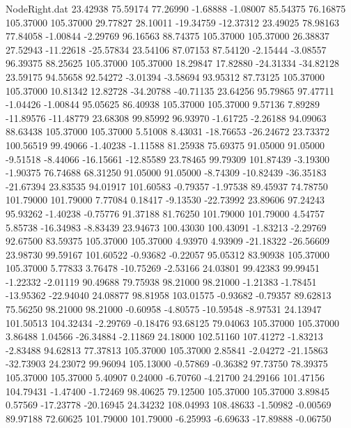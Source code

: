 \begin{filecontents}{NodeRight.dat}
  23.42938   75.59174   77.26990    -1.68888   -1.08007   85.54375   76.16875  105.37000  105.37000   29.77827   28.10011  -19.34759  -12.37312
  23.49025   78.98163   77.84058    -1.00844   -2.29769   96.16563   88.74375  105.37000  105.37000   26.38837   27.52943  -11.22618  -25.57834
  23.54106   87.07153   87.54120    -2.15444   -3.08557   96.39375   88.25625  105.37000  105.37000   18.29847   17.82880  -24.31334  -34.82128
  23.59175   94.55658   92.54272    -3.01394   -3.58694   93.95312   87.73125  105.37000  105.37000   10.81342   12.82728  -34.20788  -40.71135
  23.64256   95.79865   97.47711    -1.04426   -1.00844   95.05625   86.40938  105.37000  105.37000    9.57136    7.89289  -11.89576  -11.48779
  23.68308   99.85992   96.93970    -1.61725   -2.26188   94.09063   88.63438  105.37000  105.37000    5.51008    8.43031  -18.76653  -26.24672
  23.73372  100.56519   99.49066    -1.40238   -1.11588   81.25938   75.69375   91.05000   91.05000   -9.51518   -8.44066  -16.15661  -12.85589
  23.78465   99.79309  101.87439    -3.19300   -1.90375   76.74688   68.31250   91.05000   91.05000   -8.74309  -10.82439  -36.35183  -21.67394
  23.83535   94.01917  101.60583    -0.79357   -1.97538   89.45937   74.78750  101.79000  101.79000    7.77084    0.18417   -9.13530  -22.73992
  23.89606   97.24243   95.93262    -1.40238   -0.75776   91.37188   81.76250  101.79000  101.79000    4.54757    5.85738  -16.34983   -8.83439
  23.94673  100.43030  100.43091    -1.83213   -2.29769   92.67500   83.59375  105.37000  105.37000    4.93970    4.93909  -21.18322  -26.56609
  23.98730   99.59167  101.60522    -0.93682   -0.22057   95.05312   83.90938  105.37000  105.37000    5.77833    3.76478  -10.75269   -2.53166
  24.03801   99.42383   99.99451    -1.22332   -2.01119   90.49688   79.75938   98.21000   98.21000   -1.21383   -1.78451  -13.95362  -22.94040
  24.08877   98.81958  103.01575    -0.93682   -0.79357   89.62813   75.56250   98.21000   98.21000   -0.60958   -4.80575  -10.59548   -8.97531
  24.13947  101.50513  104.32434    -2.29769   -0.18476   93.68125   79.04063  105.37000  105.37000    3.86488    1.04566  -26.34884   -2.11869
  24.18000  102.51160  107.41272    -1.83213   -2.83488   94.62813   77.37813  105.37000  105.37000    2.85841   -2.04272  -21.15863  -32.73903
  24.23072   99.96094  105.13000    -0.57869   -0.36382   97.73750   78.39375  105.37000  105.37000    5.40907    0.24000   -6.70760   -4.21700
  24.29166  101.47156  104.79431    -1.47400   -1.72469   98.40625   79.12500  105.37000  105.37000    3.89845    0.57569  -17.23778  -20.16945
  24.34232  108.04993  108.48633    -1.50982   -0.00569   89.97188   72.60625  101.79000  101.79000   -6.25993   -6.69633  -17.89888   -0.06750

\end{filecontents}
